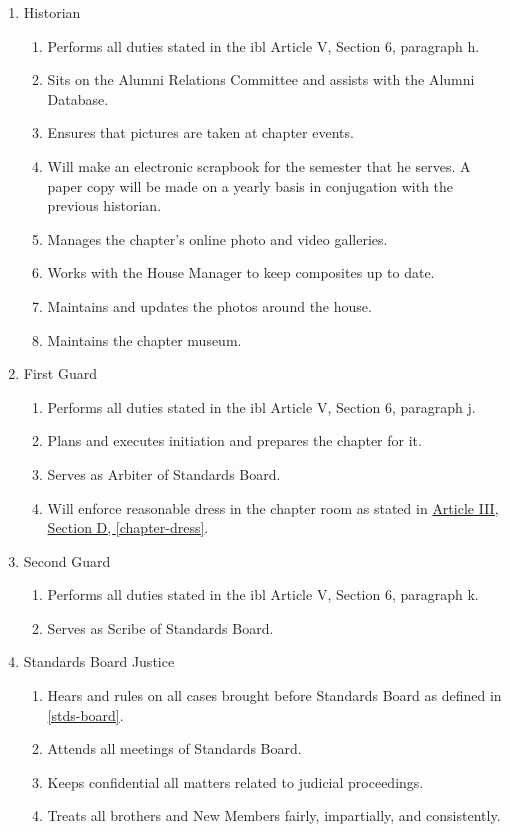 \begin{enumerate}
		\item Historian
			\begin{enumerate}
				\item Performs all duties stated in the \gls{ibl} Article V, Section 6, paragraph h.
				\item Sits on the Alumni Relations Committee and assists with the Alumni Database.
				\item Ensures that pictures are taken at chapter events.
				\item Will make an electronic scrapbook for the semester that he serves. A paper copy will be made on a yearly basis in conjugation with the previous historian.
				\item Manages the chapter's online photo and video galleries.
				\item Works with the House Manager to keep composites up to date.
				\item Maintains and updates the photos around the house.
				\item Maintains the chapter museum.
			\end{enumerate}
			
		
		\item First Guard
			\begin{enumerate}
				\item Performs all duties stated in the \gls{ibl} Article V, Section 6, paragraph j.
				\item Plans and executes initiation and prepares the chapter for it.
				\item Serves as Arbiter of Standards Board.
				\item Will enforce reasonable dress in the chapter room as stated in \hyperref[chapter-dress]{Article III, Section D, \autoref*{chapter-dress}}. 
			\end{enumerate}

		\item Second Guard
			\begin{enumerate}
				\item Performs all duties stated in the \gls{ibl} Article V, Section 6, paragraph k.
				\item Serves as Scribe of Standards Board.
			\end{enumerate}
		\item Standards Board Justice
			\begin{enumerate}
				\item Hears and rules on all cases brought before Standards Board as defined in \autoref{stds-board}.
				\item Attends all meetings of Standards Board.
				\item Keeps confidential all matters related to judicial proceedings.
				\item Treats all brothers and New Members fairly, impartially, and consistently.
			\end{enumerate}
	

	\end{enumerate}

